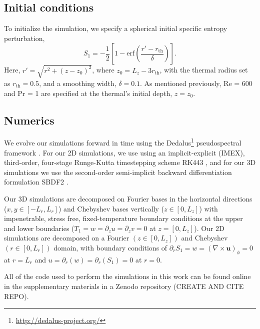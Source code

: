 \documentclass[twocolumn, amsmath, amsfonts, amssymb, trackchanges]{aastex62}
\newcommand{\grad}{\ensuremath{\nabla}}
\begin{document}
\subsection{Initial conditions}
To initialize the simulation, we specify a spherical initial specific entropy perturbation,
\begin{equation}
S_1 = - \frac{1}{2}\left[1 - \text{erf}\left(\frac{r' - r_{\text{th}}}{\delta}\right)\right].
\label{eqn:thermal_IC}
\end{equation}
Here, $r' = \sqrt{r^2 + (z - z_0)^2}$, where $z_0 = L_z - 3r_{\text{th}}$, with the thermal radius set as $r_{\text{th}} = 0.5$, and a smoothing width, $\delta = 0.1$.
As mentioned previously, Re = 600 and Pr = 1 are specified at the thermal's initial depth, $z = z_0$.

\subsection{Numerics}
We evolve our simulations forward in time using the  Dedalus\footnote{\url{http://dedalus-project.org/}} pseudospectral framework \citep{burns&all2016, burns&all2019}. 
For our 2D simulations, we use using an implicit-explicit (IMEX), third-order, four-stage Runge-Kutta timestepping scheme RK443 \citep{ascher&all1997}, and for our 3D simulations we use the second-order semi-implicit backward differentiation formulation SBDF2 \citep{wang&ruuth2008}.

Our 3D simulations are decomposed on Fourier bases in the horizontal directions ($x, y \in [-L_r, L_r]$) and Chebyshev bases vertically ($z \in [0, L_z]$) with impenetrable, stress free, fixed-temperature boundary conditions at the upper and lower boundaries ($T_1 = w = \partial_z u = \partial_z v = 0$ at $z = [0, L_z]$).
Our 2D simulations are decomposed on a Fourier $(z \in [0, L_z])$ and Chebyshev $(r \in [0, L_r])$ domain, with boundary conditions of $\partial_r S_1 = w = (\grad\times\bm{u})_\phi = 0$ at $r = L_r$ and $u = \partial_r(w) = \partial_r(S_1) = 0$ at $r = 0$.

All of the code used to perform the simulations in this work can be found online in the supplementary materials in a Zenodo repository (CREATE AND CITE REPO).


\end{document}
